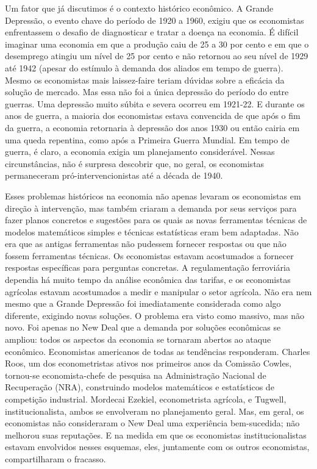 \documentclass[a4paper,12pt]{article}[abntex2]
\begin{document}
Um fator que já discutimos é o contexto histórico econômico. A Grande Depressão, o evento chave do período de 1920 a 1960, exigiu que os economistas enfrentassem o desafio de diagnosticar e tratar a doença na economia. É difícil imaginar uma economia em que a produção caiu de 25 a 30 por cento e em que o desemprego atingiu um nível de 25 por cento e não retornou ao seu nível de 1929 até 1942 (apesar do estímulo à demanda dos aliados em tempo de guerra). Mesmo os economistas mais laissez-faire teriam dúvidas sobre a eficácia da solução de mercado. Mas essa não foi a única depressão do período do entre guerras. Uma depressão muito súbita e severa ocorreu em 1921-22. E durante os anos de guerra, a maioria dos economistas estava convencida de que após o fim da guerra, a economia retornaria à depressão dos anos 1930 ou então cairia em uma queda repentina, como após a Primeira Guerra Mundial. Em tempo de guerra, é claro, a economia exigia um planejamento considerável. Nessas circunstâncias, não é surpresa descobrir que, no geral, os economistas permaneceram pró-intervencionistas até a década de 1940.

Esses problemas históricos na economia não apenas levaram os economistas em direção à intervenção, mas também criaram a demanda por seus serviços para fazer planos concretos e sugestões para os quais as novas ferramentas técnicas de modelos matemáticos simples e técnicas estatísticas eram bem adaptadas. Não era que as antigas ferramentas não pudessem fornecer respostas ou que não fossem ferramentas técnicas. Os economistas estavam acostumados a fornecer respostas específicas para perguntas concretas. A regulamentação ferroviária dependia há muito tempo da análise econômica das tarifas, e os economistas agrícolas estavam acostumados a medir e manipular o setor agrícola. Não era nem mesmo que a Grande Depressão foi imediatamente considerada como algo diferente, exigindo novas soluções. O problema era visto como massivo, mas não novo. Foi apenas no New Deal que a demanda por soluções econômicas se ampliou: todos os aspectos da economia se tornaram abertos ao ataque econômico. Economistas americanos de todas as tendências responderam. Charles Roos, um dos econometristas ativos nos primeiros anos da Comissão Cowles, tornou-se economista-chefe de pesquisa na Administração Nacional de Recuperação (NRA), construindo modelos matemáticos e estatísticos de competição industrial. Mordecai Ezekiel, econometrista agrícola, e Tugwell, institucionalista, ambos se envolveram no planejamento geral. Mas, em geral, os economistas não consideraram o New Deal uma experiência bem-sucedida; não melhorou suas reputações. E na medida em que os economistas institucionalistas estavam envolvidos nesses esquemas, eles, juntamente com os outros economistas, compartilharam o fracasso.
\end{document}
